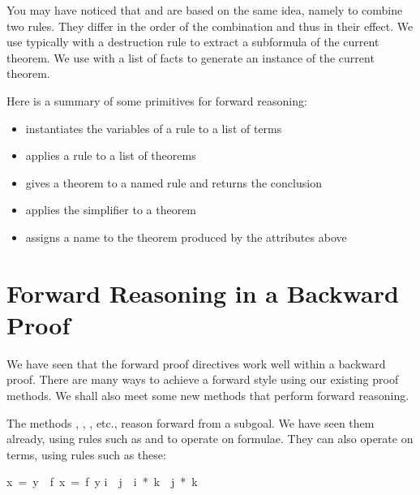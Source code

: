 You may have noticed that  and  are based on 
the same idea, namely to combine two rules.  They differ in the
order of the combination and thus in their effect.  We use 
typically with a destruction rule to extract a subformula of the current
theorem.  We use  with a list of facts to generate an instance of
the current theorem.%

Here is a summary of some primitives for forward reasoning:
\begin{itemize}
\item {} instantiates the variables of a rule to a list of terms
\item {} applies a rule to a list of theorems
\item {} gives a theorem to a named rule and returns the
conclusion 
\item {} applies the simplifier to a theorem
\item {} assigns a name to the theorem produced by the
attributes above
\end{itemize}


\section{Forward Reasoning in a Backward Proof}

We have seen that the forward proof directives work well within a backward 
proof.  There are many ways to achieve a forward style using our existing
proof methods.  We shall also meet some new methods that perform forward
reasoning.  

The methods , , , etc.,
reason forward from a subgoal.  We have seen them already, using rules such as
 and
 to operate on formulae.  They can also operate on terms, using rules
such as these:
\begin{isabelle}
x\ =\ y\ \isasymLongrightarrow \ f\ x\ =\ f\ y%
\isanewline
i\ \isasymle \ j\ \isasymLongrightarrow \ i\ *\ k\ \isasymle \ j\ *\ k%
\end{isabelle}

